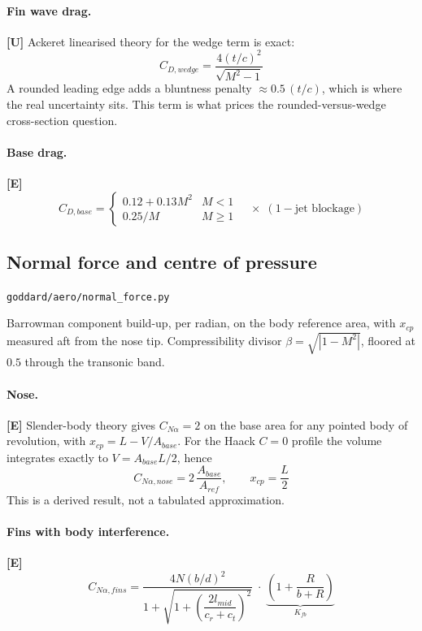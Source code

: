 \documentclass[11pt,a4paper]{article}
\newcommand{\established}{\textcolor{okgreen}{\textbf{[E]}}\xspace}
\newcommand{\unvalidated}{\textcolor{danger}{\textbf{[U]}}\xspace}
\newcommand{\src}[1]{\hfill{\footnotesize\texttt{#1}}}
\begin{document}
\paragraph{Fin wave drag.} \unvalidated
Ackeret linearised theory for the wedge term is exact:
\begin{equation}
C_{D,wedge} = \frac{4 (t/c)^2}{\sqrt{M^2-1}}
\end{equation}
A rounded leading edge adds a bluntness penalty $\approx 0.5\,(t/c)$, which is
where the real uncertainty sits. This term is what prices the rounded-versus-wedge
cross-section question.

\paragraph{Base drag.} \established
\begin{equation}
C_{D,base} =
\begin{cases}
0.12 + 0.13 M^2 & M < 1\\
0.25/M & M \geq 1
\end{cases}
\quad\times\;(1 - \text{jet blockage})
\end{equation}

\subsection{Normal force and centre of pressure}
\src{goddard/aero/normal\_force.py}

Barrowman component build-up, per radian, on the body reference area, with
$x_{cp}$ measured aft from the nose tip. Compressibility divisor
$\beta = \sqrt{|1 - M^2|}$, floored at $0.5$ through the transonic band.

\paragraph{Nose.} \established
Slender-body theory gives $C_{N\alpha} = 2$ on the base area for any pointed
body of revolution, with $x_{cp} = L - V/A_{base}$. For the Haack $C=0$ profile
the volume integrates exactly to $V = A_{base}L/2$, hence
\begin{equation}
C_{N\alpha,nose} = 2\,\frac{A_{base}}{A_{ref}}, \qquad x_{cp} = \frac{L}{2}
\end{equation}
This is a derived result, not a tabulated approximation.

\paragraph{Fins with body interference.} \established
\begin{equation}
C_{N\alpha,fins} =
\frac{4 N (b/d)^2}
     {1 + \sqrt{1 + \left(\dfrac{2 l_{mid}}{c_r + c_t}\right)^2}}
\;\cdot\;
\underbrace{\left(1 + \frac{R}{b + R}\right)}_{K_{fb}}
\end{equation}
\end{document}
